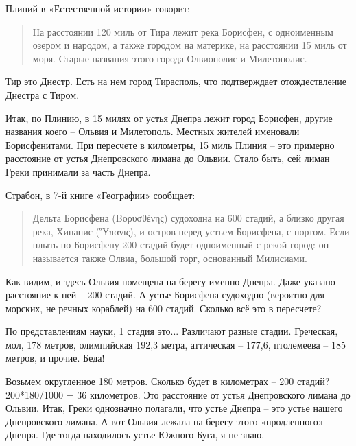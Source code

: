Плиний в «Естественной истории» говорит:

\begin{quotation}
На расстоянии 120 миль от Тира лежит река Борисфен, с одноименным озером и народом, а также городом на материке, на расстоянии 15 миль от моря. Старые названия этого города Олвиополис и Милетополис.
\end{quotation}

Тир это Днестр. Есть на нем город Тирасполь, что подтверждает отождествление Днестра с Тиром.

Итак, по Плинию, в 15 милях от устья Днепра  лежит город Борисфен, другие названия коего – Ольвия и Милетополь. Местных жителей именовали Борисфенитами. При пересчете в километры, 15 миль Плиния – это примерно расстояние от устья Днепровского лимана до Ольвии. Стало быть, сей лиман Греки принимали за часть Днепра.

Страбон, в 7-й книге «Географии» сообщает:

\begin{quotation}
Дельта Борисфена (Βορυσθένης) судоходна на 600 стадий, а близко другая река, Хипанис (Ὕπανις), и остров перед устьем Борисфена, с портом. Если плыть по Борисфену 200 стадий будет одноименный с рекой город: он называется также Олвиа, большой торг, основанный Милисиами.
\end{quotation}


Как видим, и здесь Ольвия помещена на берегу именно Днепра. Даже указано расстояние к ней – 200 стадий. А устье Борисфена судоходно (вероятно для морских, не речных кораблей) на 600 стадий. Сколько всё это в пересчете?

По представлениям науки, 1 стадия это... Различают разные стадии. Греческая, мол, 178 метров, олимпийская 192,3 метра, аттическая – 177,6, птолемеева – 185 метров, и прочие. Беда! 

Возьмем округленное 180 метров. Сколько будет в километрах – 200 стадий? 200*180/1000 = 36 километров. Это расстояние от устья Днепровского лимана до Ольвии. Итак, Греки однозначно полагали, что устье Днепра – это устье нашего Днепровского лимана. А вот Ольвия лежала на берегу этого «продленного» Днепра. Где тогда находилось устье Южного Буга, я не знаю.

